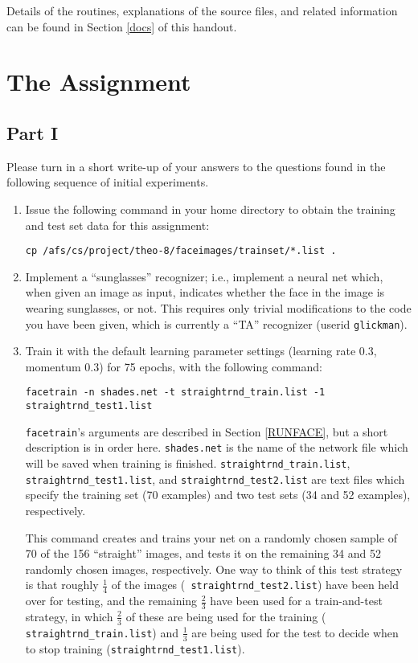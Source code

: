 Details of the routines, explanations of the source files, and
related information can be found in Section \ref{docs} of this handout.

\section{The Assignment}

\subsection{Part I}

Please turn in a short write-up of your answers to the questions found
in the following sequence of initial experiments.

\begin{enumerate}

\item Issue the following command in your home directory to obtain
the training and test set data for this assignment:

{\tt cp /afs/cs/project/theo-8/faceimages/trainset/*.list .}

\item Implement a ``sunglasses'' recognizer; i.e., implement a neural net
which, when given an image as input, indicates whether the face in the
image is wearing sunglasses, or not. This requires only trivial modifications
to the code you have been given, which is currently a ``TA'' recognizer
(userid {\tt glickman}).

\item Train it with the default learning parameter settings (learning
rate 0.3, momentum 0.3) for 75 epochs, with the following command:

{\tt facetrain -n shades.net -t straightrnd\_train.list -1 straightrnd\_test1.list}

{\tt facetrain}'s arguments are described in Section \ref{RUNFACE},
but a short description is in order here.  {\tt shades.net} is the name of
the network file which will be saved when training is finished.
{\tt straightrnd\_train.list}, {\tt straightrnd\_test1.list}, and
{\tt straightrnd\_test2.list} are text files which specify the training
set (70 examples) and two test sets (34 and 52 examples), respectively.

This command creates and trains your net on a randomly chosen sample of 70
of the 156 ``straight'' images, and tests it on the remaining 34 and 52
randomly chosen images, respectively.  One way to think of this test
strategy is that roughly $\frac{1}{4}$ of the images ({\tt
straightrnd\_test2.list}) have been held over for testing, and the remaining
$\frac{2}{3}$ have been used for a train-and-test strategy, in which
$\frac{2}{3}$ of these are being used for the training ({\tt
straightrnd\_train.list}) and $\frac{1}{3}$ are being used for the test to
decide when to stop training ({\tt straightrnd\_test1.list}).


\end{enumerate}
